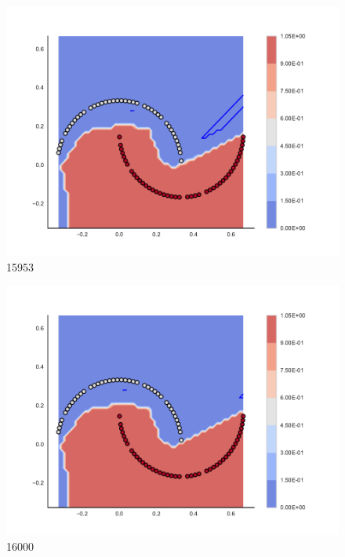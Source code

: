 \begin{subfigure}[b]{0.09\textwidth}
    \includegraphics[clip, trim=2.35cm 1.75cm 4.5cm 0cm,width=\textwidth]{img/convergence/15953.pdf}
    \caption{15953}
    \label{fig:convergence_15953}
\end{subfigure}
%
\begin{subfigure}[b]{0.09\textwidth}
    \includegraphics[clip, trim=2.35cm 1.75cm 4.5cm 0cm,width=\textwidth]{img/convergence/16000.pdf}
    \caption{16000}
    \label{fig:convergence_16000}
\end{subfigure}
%
